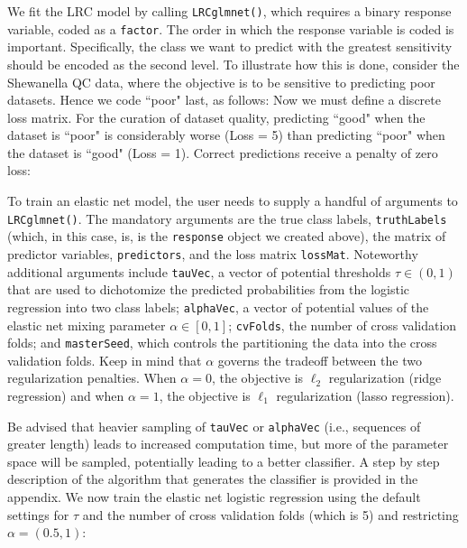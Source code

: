 \documentclass{article}
\begin{document}
\noindent We fit the LRC model by calling {\tt LRCglmnet()}, which 
requires a binary response variable, coded
as a {\tt factor}.  The order in which the response variable
is coded is important.  Specifically, the class we want to predict with
the greatest sensitivity should be encoded as the second level. To illustrate how this
is done, consider the Shewanella QC data, where the objective is to be
sensitive to predicting poor datasets.  Hence we code ``poor" last, as follows:
\noindent Now we must define a discrete loss matrix. For the curation
of dataset quality, predicting ``good" when the dataset is ``poor" is considerably 
worse (Loss = 5) than predicting ``poor" when the dataset
is ``good" (Loss = 1).  Correct predictions receive a penalty of zero loss:

% 

To train an elastic net model, the user needs to supply a handful of arguments to {\tt LRCglmnet()}. 
The mandatory arguments are the true class labels, {\tt truthLabels} (which, in this case, is, is the {\tt response} 
object we created above), the matrix of predictor variables, {\tt predictors}, 
and the loss matrix {\tt lossMat}. Noteworthy additional arguments include {\tt tauVec}, a vector of potential 
thresholds $\tau \in (0, 1)$ that are used to dichotomize the predicted probabilities from the logistic regression 
into two class labels; {\tt alphaVec}, a vector of potential values of the elastic net mixing parameter 
$\alpha \in [0, 1]$; {\tt cvFolds}, the number of cross validation folds; and {\tt masterSeed}, which controls 
the partitioning the data into the cross validation folds. Keep in mind that $\alpha$ governs the tradeoff between 
the two regularization penalties. When $\alpha = 0$, the objective is $\ell_2$ regularization (ridge regression) 
and when $\alpha = 1$, the objective is $\ell_1$ regularization (lasso regression).   

Be advised that heavier sampling of {\tt tauVec} or {\tt alphaVec} (i.e., sequences of greater length) leads to 
increased computation time, but more of the parameter space will be sampled, potentially leading to a better 
classifier. A step by step description of the algorithm that generates the classifier is provided in the appendix.  
We now train the elastic net logistic regression using the default settings for $\tau$ and the number of cross 
validation folds (which is 5) and restricting $\alpha = (0.5, 1)$:
% 
% 
\end{document}

